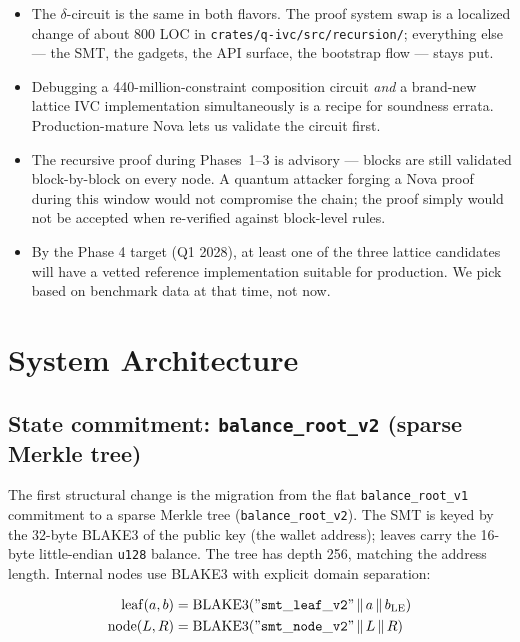 \documentclass[11pt,a4paper]{article}
\begin{document}
\begin{itemize}[leftmargin=*]
  \item The $\delta$-circuit is the same in both flavors. The proof
        system swap is a localized change of about 800 LOC in
        \texttt{crates/q-ivc/src/recursion/}; everything else --- the
        SMT, the gadgets, the API surface, the bootstrap flow --- stays put.
  \item Debugging a 440-million-constraint composition circuit
        \emph{and} a brand-new lattice IVC implementation simultaneously
        is a recipe for soundness errata. Production-mature Nova lets us
        validate the circuit first.
  \item The recursive proof during Phases~1--3 is advisory --- blocks
        are still validated block-by-block on every node. A quantum
        attacker forging a Nova proof during this window would not
        compromise the chain; the proof simply would not be accepted
        when re-verified against block-level rules.
  \item By the Phase 4 target (Q1 2028), at least one of the three
        lattice candidates will have a vetted reference implementation
        suitable for production. We pick based on benchmark data at
        that time, not now.
\end{itemize}

\section{System Architecture}
\label{sec:architecture}

\subsection{State commitment: \texttt{balance\_root\_v2} (sparse Merkle tree)}

The first structural change is the migration from the flat
\texttt{balance\_root\_v1} commitment to a sparse Merkle tree
(\texttt{balance\_root\_v2}). The SMT is keyed by the 32-byte BLAKE3 of the
public key (the wallet address); leaves carry the 16-byte little-endian
\texttt{u128} balance. The tree has depth 256, matching the address length.
Internal nodes use BLAKE3 with explicit domain separation:

\[
  \begin{aligned}
    \mathrm{leaf}(a, b) &= \mathrm{BLAKE3}(\mathtt{"smt\_leaf\_v2"} \,\|\, a \,\|\, b_{\mathrm{LE}}) \\
    \mathrm{node}(L, R) &= \mathrm{BLAKE3}(\mathtt{"smt\_node\_v2"} \,\|\, L \,\|\, R)
  \end{aligned}
\]
\end{document}
